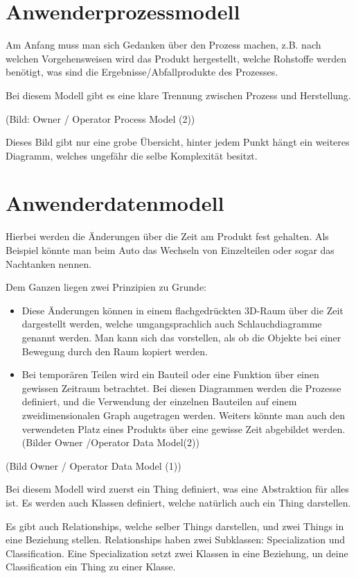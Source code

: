 \section{Anwenderprozessmodell}
Am Anfang muss man sich Gedanken über den Prozess machen, z.B. nach welchen Vorgehensweisen wird das Produkt hergestellt, welche Rohstoffe werden benötigt, was sind die Ergebnisse/Abfallprodukte des Prozesses.

Bei diesem Modell gibt es eine klare Trennung zwischen Prozess und Herstellung.

(Bild: Owner / Operator Process Model (2))

Dieses Bild gibt nur eine grobe Übersicht, hinter jedem Punkt hängt ein weiteres Diagramm, welches ungefähr die selbe Komplexität besitzt.

\section{Anwenderdatenmodell}
Hierbei werden die Änderungen über die Zeit am Produkt fest gehalten. Als Beispiel könnte man beim Auto das Wechseln von Einzelteilen oder sogar das Nachtanken nennen.

Dem Ganzen liegen zwei Prinzipien zu Grunde:

\begin{itemize}
\item Diese Änderungen können in einem flachgedrückten 3D-Raum über die Zeit dargestellt werden, welche umgangsprachlich auch Schlauchdiagramme genannt werden. Man kann sich das vorstellen, als ob die Objekte bei einer Bewegung durch den Raum kopiert werden.
\item Bei temporären Teilen wird ein Bauteil oder eine Funktion über einen gewissen Zeitraum betrachtet. Bei diesen Diagrammen werden die Prozesse definiert, und die Verwendung der einzelnen Bauteilen auf einem zweidimensionalen Graph augetragen werden. Weiters könnte man auch den verwendeten Platz eines Produkts über eine gewisse Zeit abgebildet werden. (Bilder Owner /Operator Data Model(2))
\end{itemize}

(Bild Owner / Operator Data Model (1))

Bei diesem Modell wird zuerst ein Thing definiert, was eine Abstraktion für alles ist. Es werden auch Klassen definiert, welche natürlich auch ein Thing darstellen.

Es gibt auch Relationships, welche selber Things darstellen, und zwei Things in eine Beziehung stellen. Relationships haben zwei Subklassen: Specialization und Classification. Eine Specialization setzt zwei Klassen in eine Beziehung, un deine Classification ein Thing zu einer Klasse.

